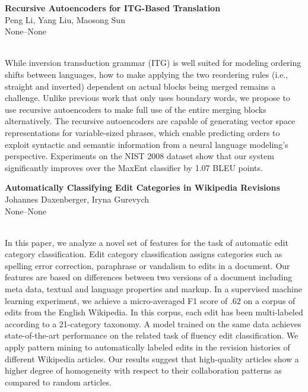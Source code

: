 \documentclass[twoside,makeidx]{book}
\renewcommand{\normalsize}{\fontsize{8}{9}\selectfont}
\renewcommand{\small}{\fontsize{7}{8}\selectfont}
\begin{document}
\par\vspace{2em}\noindent%
\begin{minipage}{\linewidth}%
\begin{center}
\textbf{\normalsize Recursive Autoencoders for ITG-Based Translation}\\
\normalsize  Peng Li,  Yang Liu,  Maosong Sun\\
{\small None--None}\\
\end{center}
\end{minipage}\\[0.5em]
\nopagebreak%
\noindent%
{\small While inversion transduction grammar (ITG) is well suited for modeling ordering shifts between languages, how to make applying the two reordering rules (i.e., straight and inverted) dependent on actual blocks being merged remains a challenge. Unlike previous work that only uses boundary words, we propose to use recursive autoencoders to make full use of the entire merging blocks alternatively. The recursive autoencoders are capable of generating vector space representations for variable-sized phrases, which enable predicting orders to exploit syntactic and semantic information from a neural language modeling's perspective. Experiments on the NIST 2008 dataset show that our system significantly improves over the MaxEnt classifier by 1.07 BLEU points.}
\par\vspace{2em}\noindent%
\begin{minipage}{\linewidth}%
\begin{center}
\textbf{\normalsize Automatically Classifying Edit Categories in Wikipedia Revisions}\\
\normalsize  Johannes Daxenberger,  Iryna Gurevych\\
{\small None--None}\\
\end{center}
\end{minipage}\\[0.5em]
\nopagebreak%
\noindent%
{\small In this paper, we analyze a novel set of features for the task of automatic edit category classification. Edit category classification assigns categories such as spelling error correction, paraphrase or vandalism to edits in a document. Our features are based on differences between two versions of a document including meta data, textual and language properties and markup. In a supervised machine learning experiment, we achieve a micro-averaged F1 score of .62 on a corpus of edits from the English Wikipedia. In this corpus, each edit has been multi-labeled according to a 21-category taxonomy. A model trained on the same data achieves state-of-the-art performance on the related task of fluency edit  classification. We apply pattern mining to automatically labeled edits in the revision histories of different Wikipedia articles. Our results suggest that high-quality articles show a higher degree of homogeneity with respect to their collaboration patterns as compared to random  articles.}
\end{document}

